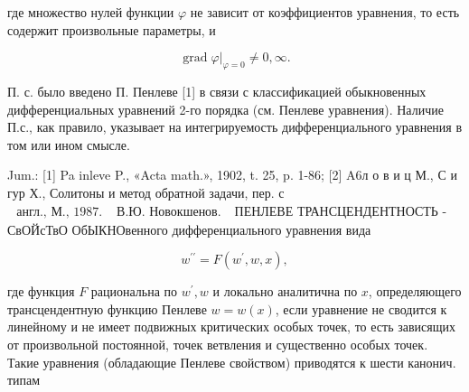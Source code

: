 \documentclass[10pt]{article}
\begin{document}
где множество нулей функции $\varphi$ не зависит от коэффициентов уравнения, то есть содержит произвольные параметры, и



\[

\left.\operatorname{grad} \varphi\right|_{\varphi=0} \neq 0, \infty .

\]



П. с. было введено П. Пенлеве [1] в связи с классификацией обыкновенных дифференциальных уравнений 2-го порядка (см. Пенлеве уравнения). Наличие П.с., как правило, указывает на интегрируемость дифференциального уравнения в том или ином смысле.



Jum.: [1] Pa inleve P., «Acta math.», 1902, t. 25, p. 1-86; [2] A6л о в и ц М., С и гур Х., Солитоны и метод обратной задачи, пер. с $\begin{array}{ll}\text { англ., М., } 1987 . & \text { В.Ю. Новокшенов. }\end{array}$ ПЕНЛЕВЕ ТРАНСЦЕНДЕНТНОСТЬ - СвОЙсТвО ОбЫКНОвенного дифференциального уравнения вида



\[

w^{\prime \prime}=F\left(w^{\prime}, w, x\right),

\]



где функция $F$ рациональна по $w^{\prime}, w$ и локально аналитична по $x$, определяющего трансцендентную функцию Пенлеве $w=w(x)$, если уравнение не сводится к линейному и не имеет подвижных критических особых точек, то есть зависящих от произвольной постоянной, точек ветвления и существенно особых точек. Такие уравнения (обладающие Пенлеве свойством) приводятся к шести канонич. типам
\end{document}
